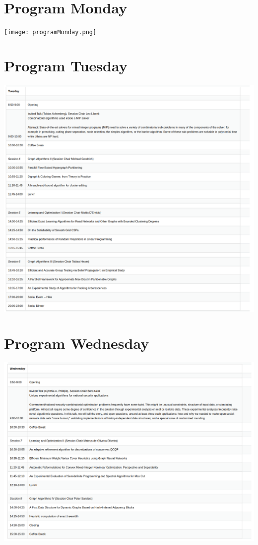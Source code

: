 \documentclass{article}
\begin{document}
\section{Program Monday}
\begin{center}
        \texttt{[image: programMonday.png]}
\end{center}
\vfill
\pagebreak
\section{Program Tuesday}
\begin{center}
        \includegraphics[width=\textwidth]{programTuesday.png}
\end{center}
\vfill
\pagebreak
\section{Program Wednesday}
\begin{center}
        \includegraphics[width=\textwidth]{programWednesday.png}
\end{center}
\end{document}
